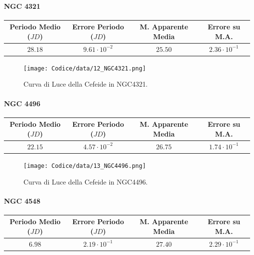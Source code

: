 \documentclass{article}
\newcommand{\e}[1]{\cdot 10^{#1}} %
\begin{document}
\paragraph{NGC 4321}
\begin{center}
  \begin{tabular}{cccc}
  \toprule
  Periodo Medio ($JD$) & Errore Periodo ($JD$) & M. Apparente Media &
                                                                  Errore
                                                                      su
                                                                      M.A. \\
  \midrule
  $28.18$ & $9.61\e{-2}$ & $25.50$ & $2.36\e{-1}$ \\
  \bottomrule
 \end{tabular}
\end{center}

\begin{figure}[H]
  \centering
  \texttt{[image: Codice/data/12\_NGC4321.png]}
  \caption{Curva di Luce della Cefeide in NGC4321.}
\end{figure}

\paragraph{NGC 4496}
\begin{center}
  \begin{tabular}{cccc}
  \toprule
  Periodo Medio ($JD$) & Errore Periodo ($JD$) & M. Apparente Media &
                                                                  Errore
                                                                      su
                                                                      M.A. \\
  \midrule
  $22.15$ & $4.57\e{-2}$ & $26.75$ & $1.74\e{-1}$ \\
  \bottomrule
 \end{tabular}
\end{center}

\begin{figure}[H]
  \centering
  \texttt{[image: Codice/data/13\_NGC4496.png]}
  \caption{Curva di Luce della Cefeide in NGC4496.}
\end{figure}

\paragraph{NGC 4548}
\begin{center}
  \begin{tabular}{cccc}
  \toprule
  Periodo Medio ($JD$) & Errore Periodo ($JD$) & M. Apparente Media &
                                                                  Errore
                                                                      su
                                                                      M.A. \\
  \midrule
  $6.98$ & $2.19\e{-1}$ & $27.40$ & $2.29\e{-1}$ \\
  \bottomrule
 \end{tabular}
\end{center}
\end{document}
